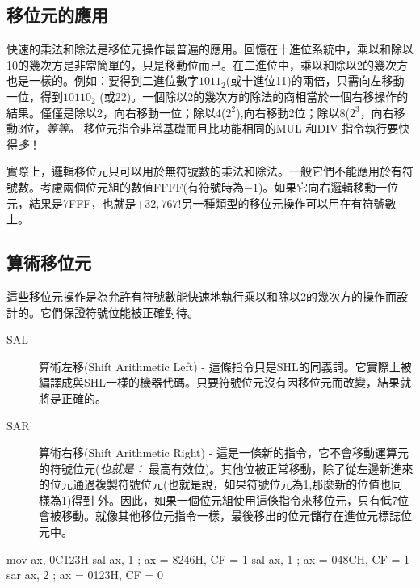 \subsection{移位元的應用}

快速的乘法和除法是移位元操作最普遍的應用。回憶在十進位系統中，乘以和除以10的幾次方是非常簡單的，只是移動位而已。在二進位中，乘以和除以2的幾次方也是一樣的。例如：要得到二進位數字$1011_2$(或十進位11)的兩倍，只需向左移動一位，得到$10110_2$
(或22)。一個除以2的幾次方的除法的商相當於一個右移操作的結果。僅僅是除以2，向右移動一位；除以4($2^2$),向右移動2位；除以8($2^3$，向右移動3位，\emph{等等。}
移位元指令非常基礎而且比功能相同的{\code MUL} 和{\code DIV}
指令執行要快得\emph{多}！

實際上，邏輯移位元只可以用於無符號數的乘法和除法。一般它們不能應用於有符號數。考慮兩個位元組的數值FFFF(有符號時為$-1$)。如果它向右邏輯移動一位元，結果是7FFF，也就是$+32,767$!另一種類型的移位元操作可以用在有符號數上。

\subsection{算術移位元}

這些移位元操作是為允許有符號數能快速地執行乘以和除以2的幾次方的操作而設計的。它們保證符號位能被正確對待。
\begin{description}
\item[SAL]  算術左移(Shift Arithmetic Left) - 這條指令只是{\code SHL}的同義詞。它實際上被編譯成與{\code               SHL}一樣的機器代碼。只要符號位元沒有因移位元而改變，結果就將是正確的。
\item[SAR]  算術右移(Shift Arithmetic Right) - 這是一條新的指令，它不會移動運算元的符號位元(\emph{也就是：}                最高有效位)。其他位被正常移動，除了從左邊新進來的位元通過複製符號位元(也就是說，如果符號位元為1,那麼新的位值也同樣為1)得到
           外。因此，如果一個位元組使用這條指令來移位元，只有低7位會被移動。就像其他移位元指令一樣，最後移出的位元儲存在進位元標誌位元中。
\end{description}

\begin{AsmCodeListing}[frame=none]
      mov    ax, 0C123H
      sal    ax, 1           ; ax = 8246H, CF = 1
      sal    ax, 1           ; ax = 048CH, CF = 1
      sar    ax, 2           ; ax = 0123H, CF = 0
\end{AsmCodeListing}

